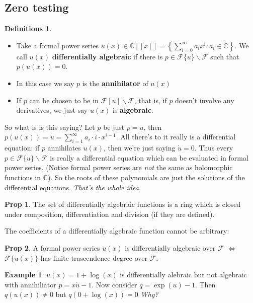 \documentclass{article}
\theoremstyle{definition}
\newtheorem*{prop}{Prop}
\newtheorem*{defns}{Definitions}
\newtheorem{ex}{Example}
\newcommand{\C}{\mathbb{C}}
\begin{document}
\subsection{Zero testing}
\begin{defns}\leavevmode
\begin{itemize}
    \item Take a formal power series $u(x)\in\C[[x]] = \left\{ \sum_{i=0}^\infty a_i x^i : a_i \in \C \right\}$. We call $u(x)$ \textbf{differentially algebraic} if there is $p\in \mathcal F\{u\}\backslash\mathcal F$ such that $p(u(x))=0$.
    \item In this case we say $p$ is the \textbf{annihilator} of $u(x)$
    \item If $p$ can be chosen to be in $\mathcal F[u]\backslash\mathcal F$, that is, if $p$ doesn't involve any derivatives, we just say $u(x)$ is \textbf{algebraic}.
\end{itemize}
\end{defns}
So what is is this saying? Let $p$ be just $p=\dot u$, then $p(u(x)) = \dot u=\sum_{i=1}^\infty a_i \cdot i \cdot x^{i-1}$. All there's to it really is a differential equation: if $p$ annihilates $u(x)$, then we're just saying $\dot u=0$. Thus every $p\in \mathcal F\{u\}\backslash\mathcal F$ is really a differential equation which can be evaluated in formal power series. (Notice formal power series are \textit{not} the same as holomorphic functions in $\C$). So the roots of these polynomials are just the solutions of the differential equations. \textit{That's the whole idea}.\par
\begin{prop}
    The set of differentially algebraic functions is a ring which is closed under composition, differentiation and division (if they are defined).
\end{prop}
The coefficients of a differentially algebraic function cannot be arbitrary:
\begin{prop}
    A formal power series $u(x)$ is differentially algebraic over $\mathcal F$ $\iff$ $\mathcal F\{u(x)\}$ has finite trascendence degree over $\mathcal F$.
\end{prop}
\begin{ex}
    $u(x)=1+\log(x)$ is differentially alebraic but not algebraic with annihiliator $p=x\dot u-1$. Now consider $q=\exp(u)-1$. Then $q(u(x))\neq0$ but $q(0+\log(x))=0$ \textit{Why?}
\end{ex}
\end{document}

